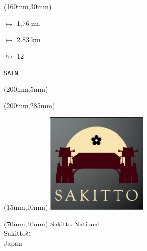 \begin{textblock*}{40mm}(160mm,30mm)%
\Large
\par$\mapsto$ 1.76 mi.
\par$\mapsto$ 2.83 km
\par$\looparrowright$ 12
\par\hfill\tiny\tt SAIN\\
\end{textblock*}
\begin{textblock*}{20mm}(200mm,5mm)%
\fbox{\thepage}
\label{SAIN}
\end{textblock*}
\begin{textblock*}{20mm}(200mm,285mm)%
\fbox{\thepage}
\end{textblock*}

\null\newpage
\begin{textblock*}{50mm}(15mm,10mm)%
\includegraphics[width=50mm]{LG/2015-05-20_00093.png}
\end{textblock*}
\begin{textblock*}{130mm}(70mm,10mm)%
{\fontsize{20}{20}\selectfont Sakitto National\\}
{\fontsize{16}{16}\selectfont Sakitto\hfill \Large$\circlearrowright$\\}
{\fontsize{12}{12}\selectfont Japan\\}
\end{textblock*}
